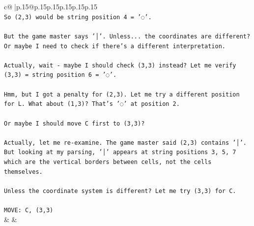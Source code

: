 \documentclass{article}
\begin{document}
{\begin{supertabular}{c@{$\;$}|p{.15\linewidth}@{}p{.15\linewidth}p{.15\linewidth}p{.15\linewidth}p{.15\linewidth}p{.15\linewidth}}
{{{\\ 
\texttt{So (2,3) would be string position 4 = '◌'.} \\
\\ 
\texttt{But the game master says '│'. Unless... the coordinates are different? Or maybe I need to check if there's a different interpretation.} \\
\\ 
\texttt{Actually, wait {-} maybe I should check (3,3) instead? Let me verify (3,3) = string position 6 = '◌'.} \\
\\ 
\texttt{Hmm, but I got a penalty for (2,3). Let me try a different position for L. What about (1,3)? That's '◌' at position 2.} \\
\\ 
\texttt{Or maybe I should move C first to (3,3)?} \\
\\ 
\texttt{Actually, let me re{-}examine. The game master said (2,3) contains '│'. But looking at my parsing, '│' appears at string positions 3, 5, 7 which are the vertical borders between cells, not the cells themselves.} \\
\\ 
\texttt{Unless the coordinate system is different? Let me try (3,3) for C.} \\
\\ 
\texttt{MOVE: C, (3,3)} \\
            }
        }
    }
    & & \\ \\


\end{supertabular}}
\end{document}
